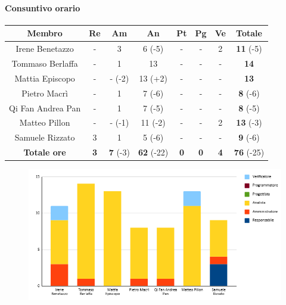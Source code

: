\paragraph{Consuntivo orario}
\begin{center}
	\renewcommand{\arraystretch}{1.8}
	\begin{tabular}{ |c|c|c|c|c|c|c|c| }
	\hline
	\textbf{Membro} & \textbf{Re} & \textbf{Am} &  \textbf{An} &  \textbf{Pt} &  \textbf{Pg} &  \textbf{Ve} &  \textbf{Totale}\\
    \hline
    Irene Benetazzo   & - & 3      & 6  (-5) & - & - & 2 & \textbf{11} (-5) \\
    \hline
    Tommaso Berlaffa  & - & 1      & 13      & - & - & - & \textbf{14}      \\
    \hline
    Mattia Episcopo   & - & - (-2) & 13 (+2) & - & - & - & \textbf{13}      \\
    \hline
    Pietro Macrì      & - & 1      & 7  (-6) & - & - & - & \textbf{8} (-6)  \\
    \hline
    Qi Fan Andrea Pan & - & 1      & 7  (-5) & - & - & - & \textbf{8} (-5)  \\
    \hline
    Matteo Pillon     & - & - (-1) & 11 (-2) & - & - & 2 & \textbf{13} (-3) \\
    \hline
    Samuele Rizzato   & 3 & 1      & 5  (-6) & - & - & - & \textbf{9} (-6)  \\
    \hline
    \textbf{Totale ore} & \textbf{3} & \textbf{7} (-3) &  \textbf{62} (-22) &  \textbf{0} &  \textbf{0} &  \textbf{4} &  \textbf{76} (-25)\\
    \hline
	\end{tabular}
\end{center}
\begin{figure}[H]
    \centering\includegraphics[width=\textwidth, height=\textheight,keepaspectratio]{images/consuntivo/RTB-requisiti-ore.png}
\end{figure}

